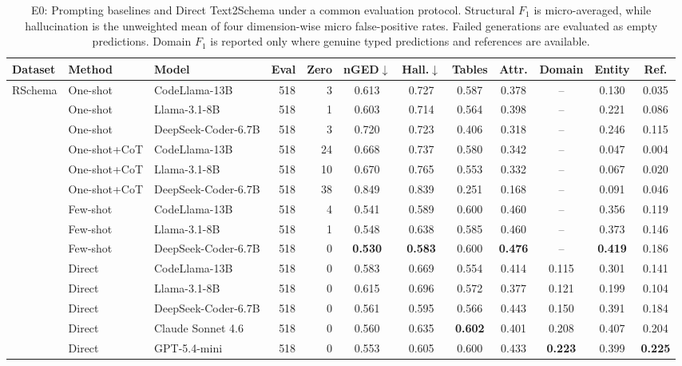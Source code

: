 \begin{table}[t]
\centering
\scriptsize
\setlength{\tabcolsep}{2.5pt}
\renewcommand{\arraystretch}{1.0}
\caption{E0: Prompting baselines and Direct Text2Schema
under a common evaluation protocol. Structural $F_1$
is micro-averaged, while hallucination is the unweighted
mean of four dimension-wise micro false-positive rates.
Failed generations are evaluated as empty predictions.
Domain $F_1$ is reported only where genuine typed
predictions and references are available.}
\label{tab:e0_baselines}

\begin{tabular*}{\textwidth}
{@{\extracolsep{\fill}}lllrrccccccc@{}}
\toprule
\textbf{Dataset} & \textbf{Method} & \textbf{Model}
& \textbf{Eval} & \textbf{Zero}
& \textbf{nGED}$\downarrow$ & \textbf{Hall.}$\downarrow$
& \textbf{Tables} & \textbf{Attr.} & \textbf{Domain}
& \textbf{Entity} & \textbf{Ref.} \\
\midrule

RSchema & One-shot & CodeLlama-13B & 518 & 3 & 0.613 & 0.727 & 0.587 & 0.378 & -- & 0.130 & 0.035 \\
 & One-shot & Llama-3.1-8B & 518 & 1 & 0.603 & 0.714 & 0.564 & 0.398 & -- & 0.221 & 0.086 \\
 & One-shot & DeepSeek-Coder-6.7B & 518 & 3 & 0.720 & 0.723 & 0.406 & 0.318 & -- & 0.246 & 0.115 \\
 & One-shot+CoT & CodeLlama-13B & 518 & 24 & 0.668 & 0.737 & 0.580 & 0.342 & -- & 0.047 & 0.004 \\
 & One-shot+CoT & Llama-3.1-8B & 518 & 10 & 0.670 & 0.765 & 0.553 & 0.332 & -- & 0.067 & 0.020 \\
 & One-shot+CoT & DeepSeek-Coder-6.7B & 518 & 38 & 0.849 & 0.839 & 0.251 & 0.168 & -- & 0.091 & 0.046 \\
 & Few-shot & CodeLlama-13B & 518 & 4 & 0.541 & 0.589 & 0.600 & 0.460 & -- & 0.356 & 0.119 \\
 & Few-shot & Llama-3.1-8B & 518 & 1 & 0.548 & 0.638 & 0.585 & 0.460 & -- & 0.373 & 0.146 \\
 & Few-shot & DeepSeek-Coder-6.7B & 518 & 0 & \textbf{0.530} & \textbf{0.583} & 0.600 & \textbf{0.476} & -- & \textbf{0.419} & 0.186 \\
 & Direct & CodeLlama-13B & 518 & 0 & 0.583 & 0.669 & 0.554 & 0.414 & 0.115 & 0.301 & 0.141 \\
 & Direct & Llama-3.1-8B & 518 & 0 & 0.615 & 0.696 & 0.572 & 0.377 & 0.121 & 0.199 & 0.104 \\
 & Direct & DeepSeek-Coder-6.7B & 518 & 0 & 0.561 & 0.595 & 0.566 & 0.443 & 0.150 & 0.391 & 0.184 \\
 & Direct & Claude Sonnet 4.6 & 518 & 0 & 0.560 & 0.635 & \textbf{0.602} & 0.401 & 0.208 & 0.407 & 0.204 \\
 & Direct & GPT-5.4-mini & 518 & 0 & 0.553 & 0.605 & 0.600 & 0.433 & \textbf{0.223} & 0.399 & \textbf{0.225} \\
\midrule


\end{tabular*}
\end{table}
